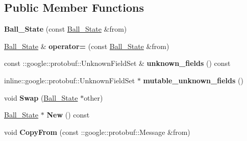 \subsection*{Public Member Functions}
\begin{DoxyCompactItemize}
\item 
{\bfseries Ball\+\_\+\+State} (const \hyperlink{classvss__state_1_1Ball__State}{Ball\+\_\+\+State} \&from)\hypertarget{classvss__state_1_1Ball__State_ac098b9cd5c2c3ddf8e51f0d2dbbf61fa}{}\label{classvss__state_1_1Ball__State_ac098b9cd5c2c3ddf8e51f0d2dbbf61fa}

\item 
\hyperlink{classvss__state_1_1Ball__State}{Ball\+\_\+\+State} \& {\bfseries operator=} (const \hyperlink{classvss__state_1_1Ball__State}{Ball\+\_\+\+State} \&from)\hypertarget{classvss__state_1_1Ball__State_aa6cd23990f9da364b87df28c633d5935}{}\label{classvss__state_1_1Ball__State_aa6cd23990f9da364b87df28c633d5935}

\item 
const \+::google\+::protobuf\+::\+Unknown\+Field\+Set \& {\bfseries unknown\+\_\+fields} () const \hypertarget{classvss__state_1_1Ball__State_a794e00572c1dadaee441bf94c11d7358}{}\label{classvss__state_1_1Ball__State_a794e00572c1dadaee441bf94c11d7358}

\item 
inline\+::google\+::protobuf\+::\+Unknown\+Field\+Set $\ast$ {\bfseries mutable\+\_\+unknown\+\_\+fields} ()\hypertarget{classvss__state_1_1Ball__State_a5d736fb563b0a4291d927a03394309b5}{}\label{classvss__state_1_1Ball__State_a5d736fb563b0a4291d927a03394309b5}

\item 
void {\bfseries Swap} (\hyperlink{classvss__state_1_1Ball__State}{Ball\+\_\+\+State} $\ast$other)\hypertarget{classvss__state_1_1Ball__State_a0e0face2c7b5e5b53793aa5e218a1623}{}\label{classvss__state_1_1Ball__State_a0e0face2c7b5e5b53793aa5e218a1623}

\item 
\hyperlink{classvss__state_1_1Ball__State}{Ball\+\_\+\+State} $\ast$ {\bfseries New} () const \hypertarget{classvss__state_1_1Ball__State_a8788d4ca0089f7f0c043f5c763fee116}{}\label{classvss__state_1_1Ball__State_a8788d4ca0089f7f0c043f5c763fee116}

\item 
void {\bfseries Copy\+From} (const \+::google\+::protobuf\+::\+Message \&from)\hypertarget{classvss__state_1_1Ball__State_a1b6e1fc62b0ed7f4a56f51107c2dea0c}{}\label{classvss__state_1_1Ball__State_a1b6e1fc62b0ed7f4a56f51107c2dea0c}


\end{DoxyCompactItemize}
